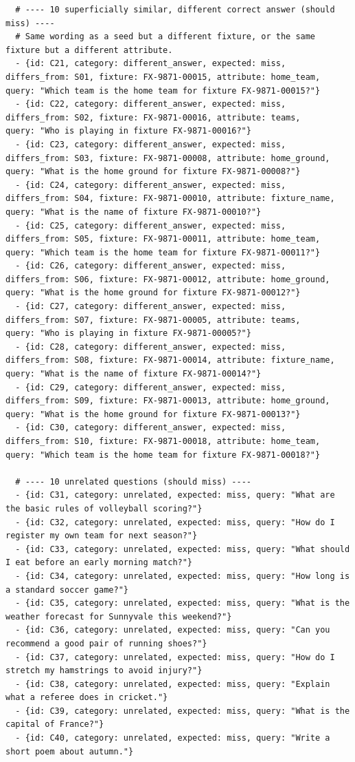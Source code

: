 \documentclass[11pt]{article}
\begin{document}
\begin{lstlisting}
  # ---- 10 superficially similar, different correct answer (should miss) ----
  # Same wording as a seed but a different fixture, or the same fixture but a different attribute.
  - {id: C21, category: different_answer, expected: miss, differs_from: S01, fixture: FX-9871-00015, attribute: home_team,    query: "Which team is the home team for fixture FX-9871-00015?"}
  - {id: C22, category: different_answer, expected: miss, differs_from: S02, fixture: FX-9871-00016, attribute: teams,        query: "Who is playing in fixture FX-9871-00016?"}
  - {id: C23, category: different_answer, expected: miss, differs_from: S03, fixture: FX-9871-00008, attribute: home_ground,  query: "What is the home ground for fixture FX-9871-00008?"}
  - {id: C24, category: different_answer, expected: miss, differs_from: S04, fixture: FX-9871-00010, attribute: fixture_name, query: "What is the name of fixture FX-9871-00010?"}
  - {id: C25, category: different_answer, expected: miss, differs_from: S05, fixture: FX-9871-00011, attribute: home_team,    query: "Which team is the home team for fixture FX-9871-00011?"}
  - {id: C26, category: different_answer, expected: miss, differs_from: S06, fixture: FX-9871-00012, attribute: home_ground,  query: "What is the home ground for fixture FX-9871-00012?"}
  - {id: C27, category: different_answer, expected: miss, differs_from: S07, fixture: FX-9871-00005, attribute: teams,        query: "Who is playing in fixture FX-9871-00005?"}
  - {id: C28, category: different_answer, expected: miss, differs_from: S08, fixture: FX-9871-00014, attribute: fixture_name, query: "What is the name of fixture FX-9871-00014?"}
  - {id: C29, category: different_answer, expected: miss, differs_from: S09, fixture: FX-9871-00013, attribute: home_ground,  query: "What is the home ground for fixture FX-9871-00013?"}
  - {id: C30, category: different_answer, expected: miss, differs_from: S10, fixture: FX-9871-00018, attribute: home_team,    query: "Which team is the home team for fixture FX-9871-00018?"}

  # ---- 10 unrelated questions (should miss) ----
  - {id: C31, category: unrelated, expected: miss, query: "What are the basic rules of volleyball scoring?"}
  - {id: C32, category: unrelated, expected: miss, query: "How do I register my own team for next season?"}
  - {id: C33, category: unrelated, expected: miss, query: "What should I eat before an early morning match?"}
  - {id: C34, category: unrelated, expected: miss, query: "How long is a standard soccer game?"}
  - {id: C35, category: unrelated, expected: miss, query: "What is the weather forecast for Sunnyvale this weekend?"}
  - {id: C36, category: unrelated, expected: miss, query: "Can you recommend a good pair of running shoes?"}
  - {id: C37, category: unrelated, expected: miss, query: "How do I stretch my hamstrings to avoid injury?"}
  - {id: C38, category: unrelated, expected: miss, query: "Explain what a referee does in cricket."}
  - {id: C39, category: unrelated, expected: miss, query: "What is the capital of France?"}
  - {id: C40, category: unrelated, expected: miss, query: "Write a short poem about autumn."}
\end{lstlisting}
\endgroup
\end{document}
